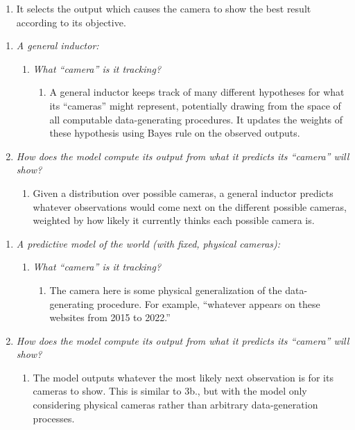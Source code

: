 {\begin{enumerate}
\begin{enumerate}
        \item It selects the output which causes the camera to show the best result according to its objective.
        \end{enumerate}
    \end{enumerate}
\begin{enumerate}
\item \textit{A general inductor:}
    \begin{enumerate}
    \item \textit{What ``camera'' is it tracking?}
        \begin{enumerate}
        \item A general inductor keeps track of many different hypotheses for what its ``cameras'' might represent, potentially drawing from the space of all computable data-generating procedures. It updates the weights of these hypothesis using Bayes rule on the observed outputs.
        \end{enumerate}
\end{enumerate}
    \item \textit{How does the model compute its output from what it predicts its ``camera'' will show?}
        \begin{enumerate}
        \item Given a distribution over possible cameras, a general inductor predicts whatever observations would come next on the different possible cameras, weighted by how likely it currently thinks each possible camera is.
        \end{enumerate}
    \end{enumerate}
\begin{enumerate}
\item \textit{A predictive model of the world (with fixed, physical cameras):}
    \begin{enumerate}
    \item \textit{What ``camera'' is it tracking?}
        \begin{enumerate}
        \item The camera here is some physical generalization of the data-generating procedure. For example, ``whatever appears on these websites from 2015 to 2022.''
        \end{enumerate}
\end{enumerate}
    \item \textit{How does the model compute its output from what it predicts its ``camera'' will show?}
        \begin{enumerate}
        \item The model outputs whatever the most likely next observation is for its cameras to show. This is similar to 3b., but with the model only considering physical cameras rather than arbitrary data-generation processes.
        \end{enumerate}
    \end{enumerate}

}
